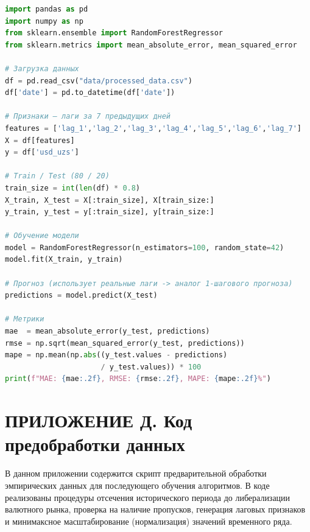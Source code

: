 \begin{lstlisting}[language=Python, basicstyle=\small\ttfamily, breaklines=true]
import pandas as pd
import numpy as np
from sklearn.ensemble import RandomForestRegressor
from sklearn.metrics import mean_absolute_error, mean_squared_error
 
# Загрузка данных
df = pd.read_csv("data/processed_data.csv")
df['date'] = pd.to_datetime(df['date'])
 
# Признаки — лаги за 7 предыдущих дней
features = ['lag_1','lag_2','lag_3','lag_4','lag_5','lag_6','lag_7']
X = df[features]
y = df['usd_uzs']
 
# Train / Test (80 / 20)
train_size = int(len(df) * 0.8)
X_train, X_test = X[:train_size], X[train_size:]
y_train, y_test = y[:train_size], y[train_size:]
 
# Обучение модели
model = RandomForestRegressor(n_estimators=100, random_state=42)
model.fit(X_train, y_train)
 
# Прогноз (использует реальные лаги -> аналог 1-шагового прогноза)
predictions = model.predict(X_test)
 
# Метрики
mae  = mean_absolute_error(y_test, predictions)
rmse = np.sqrt(mean_squared_error(y_test, predictions))
mape = np.mean(np.abs((y_test.values - predictions)
                      / y_test.values)) * 100
print(f"MAE: {mae:.2f}, RMSE: {rmse:.2f}, MAPE: {mape:.2f}%")
\end{lstlisting}
 
\section*{ПРИЛОЖЕНИЕ Д. Код предобработки данных}
\label{app:prep}

В данном приложении содержится скрипт предварительной обработки эмпирических данных для последующего обучения алгоритмов. В коде реализованы процедуры отсечения исторического периода до либерализации валютного рынка, проверка на наличие пропусков, генерация лаговых признаков и минимаксное масштабирование (нормализация) значений временного ряда.
 
